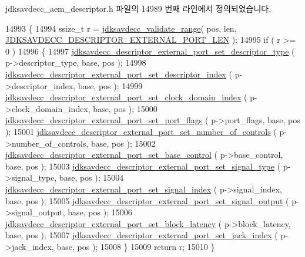 jdksavdecc\+\_\+aem\+\_\+descriptor.\+h 파일의 14989 번째 라인에서 정의되었습니다.


\begin{DoxyCode}
14993 \{
14994     ssize\_t r = \hyperlink{group__util_ga9c02bdfe76c69163647c3196db7a73a1}{jdksavdecc\_validate\_range}( pos, len, 
      \hyperlink{group__descriptor__external__port_ga4512b72d9fa1db851bb69a63e50ccbe6}{JDKSAVDECC\_DESCRIPTOR\_EXTERNAL\_PORT\_LEN} );
14995     \textcolor{keywordflow}{if} ( r >= 0 )
14996     \{
14997         \hyperlink{group__descriptor__external__port_gaa1dce85814d727d4f049df8eb3e3bdc8}{jdksavdecc\_descriptor\_external\_port\_set\_descriptor\_type}
      ( p->descriptor\_type, base, pos );
14998         \hyperlink{group__descriptor__external__port_ga1e096fc3fbfbe4782451d80a4862b89a}{jdksavdecc\_descriptor\_external\_port\_set\_descriptor\_index}
      ( p->descriptor\_index, base, pos );
14999         \hyperlink{group__descriptor__external__port_ga40e017cea5212448d74435a2d08c490e}{jdksavdecc\_descriptor\_external\_port\_set\_clock\_domain\_index}
      ( p->clock\_domain\_index, base, pos );
15000         \hyperlink{group__descriptor__external__port_ga9197ee5de50905f45cbdb8e841bfe81b}{jdksavdecc\_descriptor\_external\_port\_set\_port\_flags}
      ( p->port\_flags, base, pos );
15001         \hyperlink{group__descriptor__external__port_gaa68ce59a9db1a0d53554f3caa34608ee}{jdksavdecc\_descriptor\_external\_port\_set\_number\_of\_controls}
      ( p->number\_of\_controls, base, pos );
15002         \hyperlink{group__descriptor__external__port_gab6998594d56891fc103ec1a05bcb636f}{jdksavdecc\_descriptor\_external\_port\_set\_base\_control}
      ( p->base\_control, base, pos );
15003         \hyperlink{group__descriptor__external__port_ga6c182fd2b085869eab7dd49c8e9ffc4a}{jdksavdecc\_descriptor\_external\_port\_set\_signal\_type}
      ( p->signal\_type, base, pos );
15004         \hyperlink{group__descriptor__external__port_ga85cd2dbf6d778f9e0c48a4d325d63941}{jdksavdecc\_descriptor\_external\_port\_set\_signal\_index}
      ( p->signal\_index, base, pos );
15005         \hyperlink{group__descriptor__external__port_ga857faf1aeeeef282340e39aa23d53b3f}{jdksavdecc\_descriptor\_external\_port\_set\_signal\_output}
      ( p->signal\_output, base, pos );
15006         \hyperlink{group__descriptor__external__port_ga684eaa4ea1864fd15c1ddd496bf52a5b}{jdksavdecc\_descriptor\_external\_port\_set\_block\_latency}
      ( p->block\_latency, base, pos );
15007         \hyperlink{group__descriptor__external__port_ga523a819c899b6ab8a66ad1f2cca37417}{jdksavdecc\_descriptor\_external\_port\_set\_jack\_index}
      ( p->jack\_index, base, pos );
15008     \}
15009     \textcolor{keywordflow}{return} r;
15010 \}
\end{DoxyCode}


